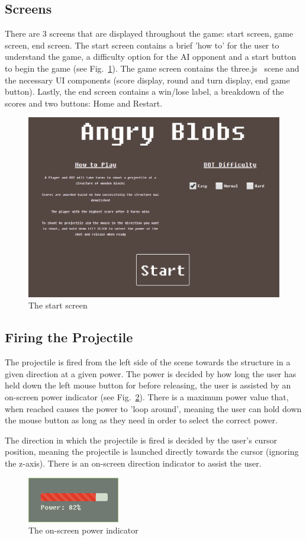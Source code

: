 \documentclass[runningheads]{llncs}
\begin{document}
	\subsection{Screens}
	There are 3 screens that are displayed throughout the game: start screen, game screen, end screen. The start screen contains a brief 'how to' for the user to understand the game, a difficulty option for the AI opponent and a start button to begin the game (see Fig.~\ref{start-screen}). The game screen contains the three.js~\cite{ref_threejs} scene and the necessary UI components (score display, round and turn display, end game button). Lastly, the end screen contains a win/lose label, a breakdown of the scores and two buttons: Home and Restart.
	\begin{figure}
		\centering
		\includegraphics[width=\textwidth]{./img/start-screen.png}
		\caption{The start screen}
		\label{start-screen}
	\end{figure}
	\subsection{Firing the Projectile}
	The projectile is fired from the left side of the scene towards the structure in a given direction at a given power. The power is decided by how long the user has held down the left mouse button for before releasing, the user is assisted by an on-screen power indicator (see Fig.~\ref{power-indicator}). There is a maximum power value that, when reached causes the power to 'loop around', meaning the user can hold down the mouse button as long as they need in order to select the correct power. 
	
	The direction in which the projectile is fired is decided by the user's cursor position, meaning the projectile is launched directly towards the cursor (ignoring the z-axis). There is an on-screen direction indicator to assist the user.
	\begin{figure}
		\centering
		\includegraphics{./img/power-indicator.png}
		\caption{The on-screen power indicator}
		\label{power-indicator}
	\end{figure}
\end{document}
